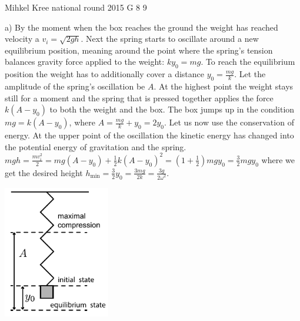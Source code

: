 \documentclass[11pt]{article}
\begin{document}
{Mihkel Kree} %
{national round} %
{2015} %
{G 8} %
{9} %
{

\ifEngSolution
a) By the moment when the box reaches the ground the weight has reached velocity a $v_i=\sqrt{2gh}$. Next the spring starts to oscillate around a new equilibrium position, meaning around the point where the spring’s tension balances gravity force applied to the weight: $ky_0=mg$. To reach the equilibrium position the weight has to additionally cover a distance $y_0=\frac{mg}{k}$. Let the amplitude of the spring’s oscillation be $A$. At the highest point the weight stays still for a moment and the spring that is pressed together applies the force $k(A-y_0)$ to both the weight and the box. The box jumps up in the condition $mg = k(A-y_0)$, where $A = \frac{mg}{k}+y_0 =2y_0$. Let us now use the conservation of energy. At the upper point of the oscillation the kinetic energy has changed into the potential energy of gravitation and the spring. $mgh=\frac{mv_i^2}{2} = mg(A-y_0) + \frac{1}{2}k(A-y_0)^2 = \left(1+ \frac{1}{2}\right)mgy_0 = \frac{3}{2}mgy_0$ where we get the desired height $h_\text{min} = \frac{3}{2}y_0 = \frac{3mg}{2k} = \frac{3g}{2\omega^2}$.
\begin{center}
\includegraphics[width=0.35\textwidth]{2015-v3g-08-vedruJoonis_v2_ing}
\end{center}
}
\end{document}
